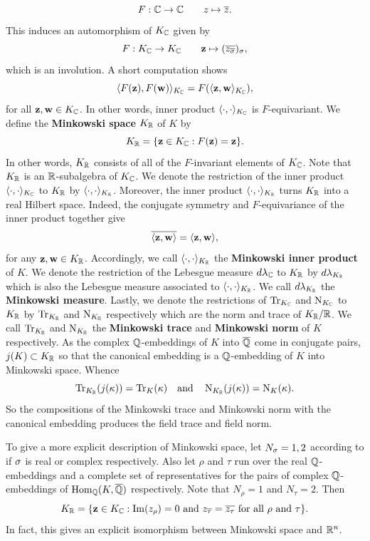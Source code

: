     \[
      F:\mathbb{C} \to \mathbb{C} \qquad z \mapsto \overline{z}.
    \]
    This induces an automorphism of \(K_{\mathbb{C}}\) given by
    \[
      F:K_{\mathbb{C}} \to K_{\mathbb{C}} \qquad \mathbf{z} \mapsto (\overline{z_{\overline{\sigma}}})_{\sigma},
    \]
    which is an involution. A short computation shows
    \[
      \langle F(\mathbf{z}),F(\mathbf{w})\rangle_{K_{\mathbb{C}}} = F(\langle\mathbf{z},\mathbf{w}\rangle_{K_{\mathbb{C}}}),
    \]
    for all \(\mathbf{z},\mathbf{w} \in K_{\mathbb{C}}\). In other words, inner product \(\langle\cdot,\cdot\rangle_{K_{\mathbb{C}}}\) is \(F\)-equivariant. We define the \textbf{Minkowski space} \(K_{\mathbb{R}}\) of \(K\) by
    \[
      K_{\mathbb{R}} = \{\mathbf{z} \in K_{\mathbb{C}}:F(\mathbf{z}) = \mathbf{z}\}.
    \]
    In other words, \(K_{\mathbb{R}}\) consists of all of the \(F\)-invariant elements of \(K_{\mathbb{C}}\). Note that \(K_{\mathbb{R}}\) is an \(\mathbb{R}\)-subalgebra of \(K_{\mathbb{C}}\). We denote the restriction of the inner product \(\langle\cdot,\cdot\rangle_{K_{\mathbb{C}}}\) to \(K_{\mathbb{R}}\) by \(\langle\cdot,\cdot\rangle_{K_{\mathbb{R}}}\). Moreover, the inner product \(\langle\cdot,\cdot\rangle_{K_{\mathbb{R}}}\) turns \(K_{\mathbb{R}}\) into a real Hilbert space. Indeed, the conjugate symmetry and \(F\)-equivariance of the inner product together give
    \[
      \overline{\langle\mathbf{z},\mathbf{w}\rangle} = \langle\mathbf{z},\mathbf{w}\rangle,
    \]
    for any \(\mathbf{z},\mathbf{w} \in K_{\mathbb{R}}\). Accordingly, we call \(\langle\cdot,\cdot\rangle_{K_{\mathbb{R}}}\) the \textbf{Minkowski inner product} of \(K\). We denote the restriction of the Lebesgue measure \(d\lambda_{\mathbb{C}}\) to \(K_{\mathbb{R}}\) by \(d\lambda_{K_{\mathbb{R}}}\) which is also the Lebesgue measure associated to \(\langle\cdot,\cdot\rangle_{K_{\mathbb{R}}}\). We call \(d\lambda_{K_{\mathbb{R}}}\) the \textbf{Minkowski measure}. Lastly, we denote the restrictions of \(\operatorname{\mathrm{Tr}}_{K_{\mathbb{C}}}\) and \(\operatorname{\mathrm{N}}_{K_{\mathbb{C}}}\) to \(K_{\mathbb{R}}\) by \(\operatorname{\mathrm{Tr}}_{K_{\mathbb{R}}}\) and \(\operatorname{\mathrm{N}}_{K_{\mathbb{R}}}\) respectively which are the norm and trace of \(K_{\mathbb{R}}/\mathbb{R}\). We call \(\operatorname{\mathrm{Tr}}_{K_{\mathbb{R}}}\) and \(\operatorname{\mathrm{N}}_{K_{\mathbb{R}}}\) the \textbf{Minkowski trace} and \textbf{Minkowski norm} of \(K\) respectively. As the complex \(\mathbb{Q}\)-embeddings of \(K\) into \(\overline{\mathbb{Q}}\) come in conjugate pairs, \(j(K) \subset K_{\mathbb{R}}\) so that the canonical embedding is a \(\mathbb{Q}\)-embedding of \(K\) into Minkowski space. Whence
    \[
      \operatorname{\mathrm{Tr}}_{K_{\mathbb{R}}}(j(\kappa)) = \operatorname{\mathrm{Tr}}_{K}(\kappa) \quad \text{and} \quad \operatorname{\mathrm{N}}_{K_{\mathbb{R}}}(j(\kappa)) = \operatorname{\mathrm{N}}_{K}(\kappa).
    \]
    So the compositions of the Minkowski trace and Minkowski norm with the canonical embedding produces the field trace and field norm.
    
    To give a more explicit description of Minkowski space, let \(N_{\sigma} = 1,2\) according to if \(\sigma\) is real or complex respectively. Also let \(\rho\) and \(\tau\) run over the real \(\mathbb{Q}\)-embeddings and a complete set of representatives for the pairs of complex \(\mathbb{Q}\)-embeddings of \(\operatorname{\mathrm{Hom}}_{\mathbb{Q}}(K,\overline{\mathbb{Q}})\) respectively. Note that \(N_{\rho} = 1\) and \(N_{\tau} = 2\). Then
    \[
      K_{\mathbb{R}} = \{\mathbf{z} \in K_{\mathbb{C}}:\mathrm{Im}(z_{\rho}) = 0 \text{ and } z_{\overline{\tau}} = \overline{z_{\tau}} \text{ for all } \rho \text{ and } \tau\}.
    \]
    In fact, this gives an explicit isomorphism between Minkowski space and \(\mathbb{R}^{n}\).
    
